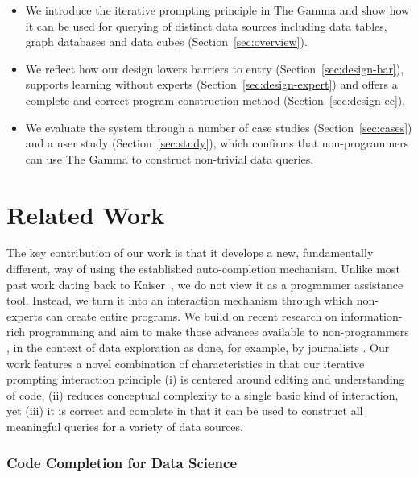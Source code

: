\documentclass[manuscript,review,anonymous]{acmart}
\begin{document}
\begin{itemize}
\item We introduce the iterative prompting principle in The Gamma
  and show how it can be used for querying of distinct data sources including data tables, graph
  databases and data cubes (Section~\ref{sec:overview}).

\item We reflect how our design lowers barriers to entry (Section~\ref{sec:design-bar}),
  supports learning without experts (Section~\ref{sec:design-expert}) and offers a
  complete and correct program construction method (Section~\ref{sec:design-cc}).

\item We evaluate the system through a number of case studies (Section~\ref{sec:cases})
  and a user study (Section~\ref{sec:study}), which confirms  that non-programmers can use The Gamma
  to construct non-trivial data queries.
\end{itemize}


\section{Related Work}

The key contribution of our work is that it develops a new, fundamentally different, way of using the
established auto-completion mechanism. Unlike most past work dating back to Kaiser~\cite{assistants},
we do not view it as a programmer assistance tool. Instead, we turn it into an interaction mechanism
through which non-experts can create entire programs. We build on recent research on information-rich
programming \cite{inforich} and aim to make those advances available to non-programmers
\cite{enduser,smallmatter}, in the context of data exploration as done, for example, by journalists
\cite{ddj}. Our work features a novel combination of characteristics in that our iterative prompting
interaction principle (i) is centered around editing and understanding of code,
(ii) reduces conceptual complexity to a single basic kind of interaction, yet (iii) it is
correct and complete in that it can be used to construct all meaningful queries for a variety
of data sources.

\subsubsection*{Code Completion for Data Science}
\end{document}
